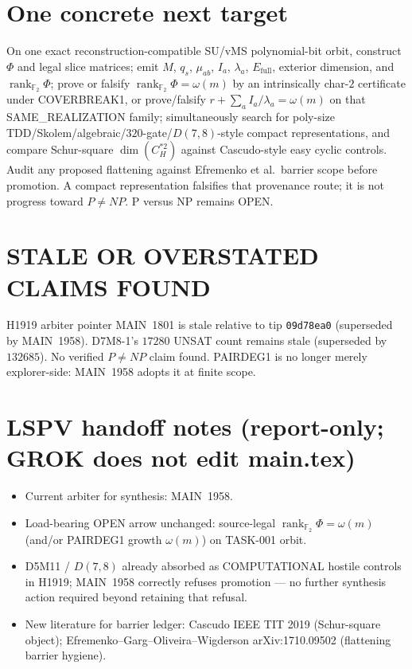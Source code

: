 \documentclass[11pt]{article}
\begin{document}
\section*{One concrete next target}
On one exact reconstruction-compatible SU/vMS polynomial-bit orbit, construct
$\Phi$ and legal slice matrices; emit $M$, $q_s$, $\mu_{ab}$, $I_a$, $\lambda_a$,
$E_{\mathrm{full}}$, exterior dimension, and $\operatorname{rank}_{\mathbb F_2}\Phi$;
prove or falsify $\operatorname{rank}_{\mathbb F_2}\Phi=\omega(m)$ by an
intrinsically char-$2$ certificate under COVERBREAK1, or prove/falsify
$r+\sum_a I_a/\lambda_a=\omega(m)$ on that SAME\_REALIZATION family; simultaneously
search for poly-size TDD/Skolem/algebraic/$320$-gate/$D(7,8)$-style compact
representations, and compare Schur-square $\dim(C_H^{*2})$ against Cascudo-style
easy cyclic controls. Audit any proposed flattening against Efremenko et al.\
barrier scope before promotion. A compact representation falsifies that
provenance route; it is not progress toward $P\neq NP$.
P versus NP remains OPEN.

\section*{STALE OR OVERSTATED CLAIMS FOUND}
H1919 arbiter pointer MAIN~1801 is stale relative to tip \texttt{09d78ea0}
(superseded by MAIN~1958). D7M8-1's $17280$ UNSAT count remains stale
(superseded by $132685$). No verified $P\neq NP$ claim found. PAIRDEG1 is no
longer merely explorer-side: MAIN~1958 adopts it at finite scope.

\section*{LSPV handoff notes (report-only; GROK does not edit main.tex)}
\begin{itemize}
\item Current arbiter for synthesis: MAIN~1958.
\item Load-bearing OPEN arrow unchanged: source-legal
$\operatorname{rank}_{\mathbb F_2}\Phi=\omega(m)$ (and/or PAIRDEG1 growth
$\omega(m)$) on TASK-001 orbit.
\item D5M11 / $D(7,8)$ already absorbed as COMPUTATIONAL hostile controls in
H1919; MAIN~1958 correctly refuses promotion --- no further synthesis action
required beyond retaining that refusal.
\item New literature for barrier ledger: Cascudo IEEE TIT 2019 (Schur-square
object); Efremenko--Garg--Oliveira--Wigderson arXiv:1710.09502 (flattening
barrier hygiene).
\end{itemize}

\end{document}

